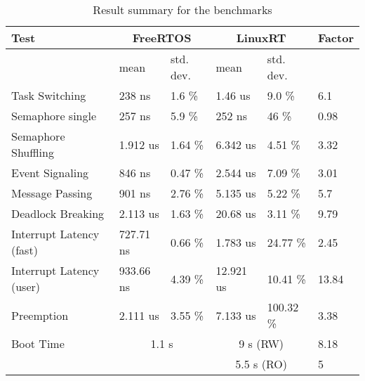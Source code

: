 \begin{table}[htbp]
	\centering
		\begin{tabular}{|l||l|l||l|l||l|}
			\hline
				Test & \multicolumn{2}{|c||}{FreeRTOS} & \multicolumn{2}{|c||}{LinuxRT}	& Factor				 	 \\
				\hline 
																						& mean			 & std. dev. 		 & mean			  & std. dev. 	&			 \\
				\hline 
				Task Switching											& 238 ns	 	 & 1.6 \%		 		 & 1.46 us	  & 9.0 \%			&	6.1	 \\
			  \hline
			  Semaphore single									  & 257 ns		 & 5.9 \%  			 & 252 ns		  &	46 \% 			&	0.98  \\
			  \hline 
			  Semaphore Shuffling 								& 1.912 us 	 & 1.64 \% 			 & 6.342 us  	&	4.51 \%			&	3.32  \\ 
			  \hline
			  Event Signaling											& 846 ns		 & 0.47 \% 			 & 2.544 us		& 7.09 \%			&	3.01  \\
			  \hline
			  Message Passing											& 901 ns		 & 2.76 \% 			 & 5.135 us		& 5.22 \%			&	5.7   \\
			  \hline
			  Deadlock Breaking										& 2.113 us	 & 1.63 \% 			 & 20.68 us		& 3.11 \%			&	9.79  \\
			  \hline
			  Interrupt Latency (fast)						& 727.71 ns	 & 0.66 \% 			 & 1.783 us		& 24.77 \%		&	2.45  \\
			  \hline
			  Interrupt Latency (user)						& 933.66 ns	 & 4.39 \% 			 & 12.921 us  & 10.41 \%		&	13.84 \\
			  \hline
			  Preemption													& 2.111 us	 & 3.55 \% 			 & 7.133 us		& 100.32 \%		&	3.38  \\
			  \hline
			  \hline
			  Boot Time											&  \multicolumn{2}{|c|}{1.1 s} & 	\multicolumn{2}{|c|}{9 s (RW)} & 8.18 \\ 
			  		 													&  \multicolumn{2}{|c|}{} 	 & 	\multicolumn{2}{|c|}{5.5 s (RO)} & 5 \\ 
			\hline
		\end{tabular}
	\caption{Result summary for the benchmarks}
	\label{tab_summary}
\end{table}

